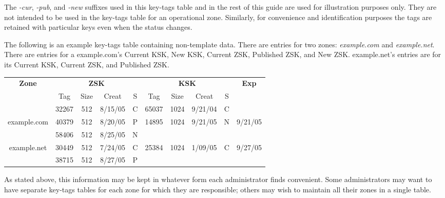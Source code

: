 \documentclass[12pt]{article}
\begin{document}
The {\it -cur}, {\it -pub}, and {\it -new} suffixes used in this key-tags
table and in the rest of this guide are used for illustration purposes only.
They are not intended to be used in the key-tags table for an operational
zone.  Similarly, for convenience and identification purposes the tags are
retained with particular keys even when the status changes.

The following is an example key-tags table containing non-template data.
There are entries for two zones:  {\it example.com} and {\it example.net}.
There are entries for a example.com's Current KSK, New KSK, Current ZSK,
Published ZSK, and New ZSK.  example.net's entries are for its Current KSK,
Current ZSK, and Published ZSK.

\begin{center}
\begin{tabular}{|c|c|c|c|c|c|c|c|c|c|}
\hline
{\bf Zone} &
\multicolumn{4}{c|}{{\bf ZSK}} &
\multicolumn{4}{c|}{{\bf KSK}} &
{\bf Exp} \\
\cline{2-9}

 & Tag & Size & Creat & S & Tag & Size & Creat & S & \\
\hline

			&
32267	&
512			&
8/15/05	&
C			&
65037	&
1024			&
9/21/04	&
C			& \\

\cline{2-9}

example.com		&
40379	&
512			&
8/20/05	&
P			&
14895	&
1024			&
9/21/05	&
N			&
9/21/05			\\

\cline{2-9}

			&
58406	&
512			&
8/25/05	&
N			&
& & & & \\

\hline

example.net		&
30449	&
512			&
7/24/05	&
C			&
25384	&
1024			&
1/09/05	&
C			&
9/27/05			\\

\cline{2-9}

			&
38715	&
512			&
8/27/05	&
P			&
& & & & \\

\hline

\end{tabular}
\end{center}

As stated above, this information may be kept in whatever form each
administrator finds convenient.  Some administrators may want to have separate
key-tags tables for each zone for which they are responsible; others may wish
to maintain all their zones in a single table.
\end{document}
